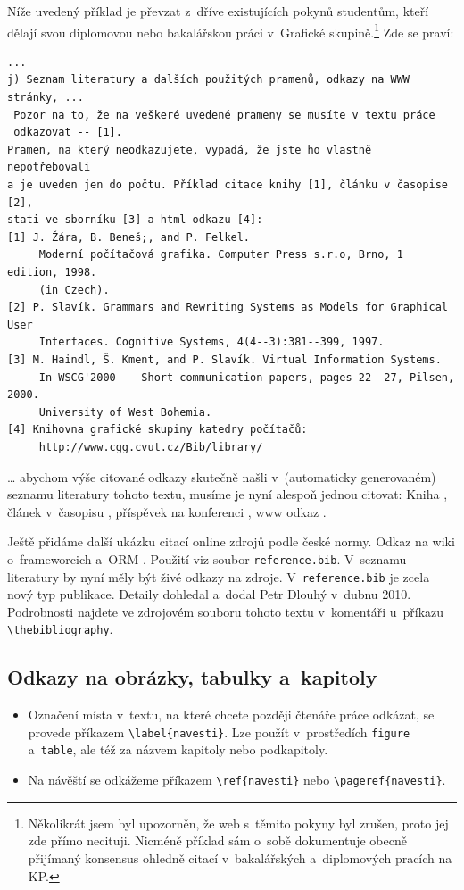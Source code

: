 \documentclass[11pt,twoside,a4paper]{book}
\begin{document}
Níže uvedený příklad je převzat z~dříve existujících pokynů studentům, kteří 
dělají svou diplomovou nebo bakalářskou práci v~Grafické skupině.\footnote{Několikrát 
jsem byl upozorněn, že web s~těmito pokyny byl zrušen, proto jej zde přímo necituji. 
Nicméně příklad sám o~sobě dokumentuje obecně přijímaný konsensus ohledně citací 
v~bakalářských a~diplomových pracích na KP.} Zde se praví:
\begin{small}
\begin{verbatim}
...
j) Seznam literatury a dalších použitých pramenů, odkazy na WWW stránky, ...
 Pozor na to, že na veškeré uvedené prameny se musíte v textu práce 
 odkazovat -- [1]. 
Pramen, na který neodkazujete, vypadá, že jste ho vlastně nepotřebovali 
a je uveden jen do počtu. Příklad citace knihy [1], článku v časopise [2], 
stati ve sborníku [3] a html odkazu [4]: 
[1] J. Žára, B. Beneš;, and P. Felkel. 
     Moderní počítačová grafika. Computer Press s.r.o, Brno, 1 edition, 1998. 
     (in Czech). 
[2] P. Slavík. Grammars and Rewriting Systems as Models for Graphical User 
     Interfaces. Cognitive Systems, 4(4--3):381--399, 1997. 
[3] M. Haindl, Š. Kment, and P. Slavík. Virtual Information Systems. 
     In WSCG'2000 -- Short communication papers, pages 22--27, Pilsen, 2000. 
     University of West Bohemia. 
[4] Knihovna grafické skupiny katedry počítačů: 
     http://www.cgg.cvut.cz/Bib/library/ 
\end{verbatim}
\end{small}
\ldots{} abychom výše citované odkazy skutečně našli v~(automaticky generovaném) seznamu literatury tohoto textu, musíme
je nyní alespoň jednou citovat: Kniha \cite{kniha}, článek v~časopisu \cite{clanek}, příspěvek na konferenci
\cite{sbornik}, www odkaz \cite{www}.

Ještě přidáme další ukázku citací online zdrojů podle české normy. Odkaz na wiki o~frameworcich \cite{wiki:framework}
a~ORM \cite{wiki:orm}. Použití viz soubor \verb|reference.bib|. V~seznamu literatury by nyní měly být živé odkazy na
zdroje. V~\verb|reference.bib| je zcela nový typ publikace. Detaily dohledal a~dodal Petr Dlouhý v~dubnu 2010.
Podrobnosti najdete ve zdrojovém souboru tohoto textu v~komentáři u~příkazu \verb|\thebibliography|.

\subsection{Odkazy na obrázky, tabulky a~kapitoly}
\begin{itemize}
\item Označení místa v~textu, na které chcete později čtenáře práce odkázat, se provede příkazem \verb|\label{navesti}|.
Lze použít v~prostředích \verb|figure| a~\verb|table|, ale též za názvem kapitoly nebo podkapitoly.
\item Na návěští se odkážeme příkazem \verb|\ref{navesti}| nebo \verb|\pageref{navesti}|.
\end{itemize}
\end{document}
